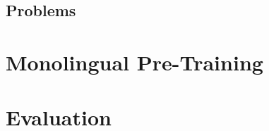 \subsection{Problems}\label{subsec:problems}



\section{Monolingual Pre-Training}\label{sec:monolingual-pre-training}



\section{Evaluation}\label{sec:evaluation}


